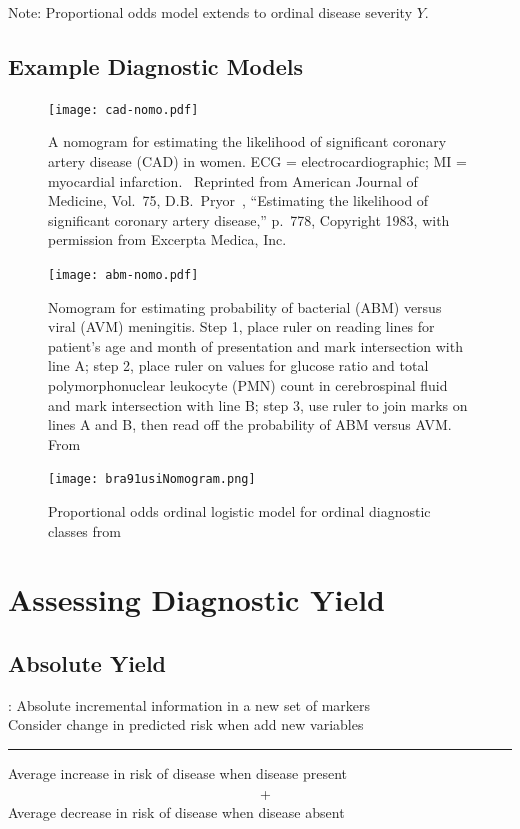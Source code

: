 Note: Proportional odds model extends to ordinal disease severity $Y$.

\subsection{Example Diagnostic Models}
\begin{figure}[!htbp]\leavevmode
\centerline{\texttt{[image: cad-nomo.pdf]}}
\caption{\large A nomogram for estimating the likelihood of significant
 coronary artery disease (CAD) in women.  ECG = electrocardiographic;
 MI = myocardial infarction.~\protect\cite{pry83}  Reprinted from
 American Journal of Medicine, Vol.\ 75, D.B.\ Pryor~\etal, ``Estimating
 the likelihood of significant coronary artery disease,'' p.\ 778,
 Copyright 1983, with permission from Excerpta Medica, Inc.}
\end{figure}

\begin{figure}[!htbp]\leavevmode%
\centerline{\texttt{[image: abm-nomo.pdf]}}
\caption{Nomogram for estimating probability of bacterial (ABM) versus viral (AVM) meningitis.  Step 1, place ruler on reading lines for patient's 
age and month of presentation and mark intersection with line A; step 2,
place ruler on values for glucose ratio and total polymorphonuclear
leukocyte (PMN) count in cerebrospinal fluid and mark intersection with line
B; step 3, use ruler to join marks on lines A and B, then read off the
probability of ABM versus AVM.  From~\protect\citet{spa89}}
\end{figure}

\begin{figure}[!htbp]\leavevmode%
\centerline{\texttt{[image: bra91usiNomogram.png]}}
\caption{Proportional odds ordinal logistic model for ordinal diagnostic classes from~\citet{bra91usi}}
\end{figure}
\clearpage

\section{Assessing Diagnostic Yield}
\subsection{Absolute Yield}
\citet{pen08eva}: Absolute incremental information in a new set of
markers\\
Consider change in predicted risk when add new variables\\
\bigskip
\hrule
\medskip
Average increase in risk of disease when disease present\\~~~~~~~~~~~~~~~~~~~~~~~~~~~~~~~~~~~~+\\
Average decrease in risk of disease when disease absent\\
\medskip

